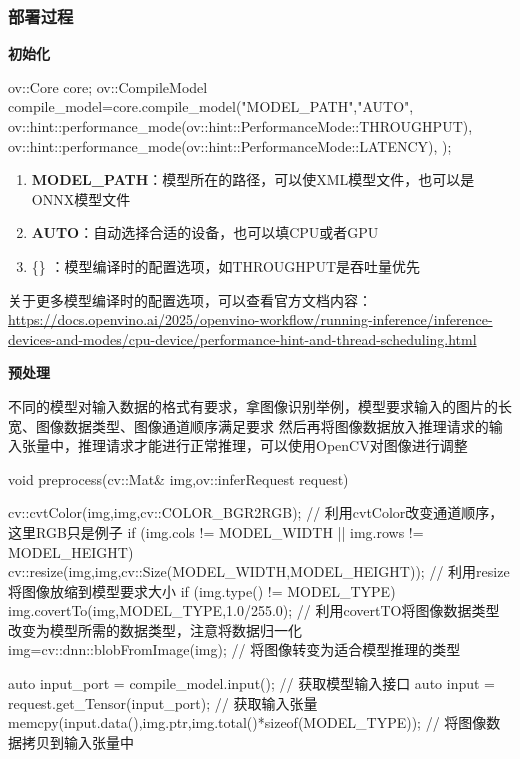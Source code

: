 \subsubsection{部署过程}

\textbf{初始化}

\begin{tcode}
    ov::Core core;
    ov::CompileModel compile_model=core.compile_model("MODEL_PATH","AUTO",{
        ov::hint::performance_mode(ov::hint::PerformanceMode::THROUGHPUT),
        ov::hint::performance_mode(ov::hint::PerformanceMode::LATENCY),
    });
\end{tcode}

\begin{enumerate}
    \item \textbf{MODEL\_PATH}：模型所在的路径，可以使XML模型文件，也可以是ONNX模型文件
    \item \textbf{AUTO}：自动选择合适的设备，也可以填CPU或者GPU
    \item \{\} ：模型编译时的配置选项，如THROUGHPUT是吞吐量优先
\end{enumerate}

关于更多模型编译时的配置选项，可以查看官方文档内容：\url{https://docs.openvino.ai/2025/openvino-workflow/running-inference/inference-devices-and-modes/cpu-device/performance-hint-and-thread-scheduling.html}

\textbf{预处理}

不同的模型对输入数据的格式有要求，拿图像识别举例，模型要求输入的图片的长宽、图像数据类型、图像通道顺序满足要求
然后再将图像数据放入推理请求的输入张量中，推理请求才能进行正常推理，可以使用OpenCV对图像进行调整

\begin{tcode}
    void preprocess(cv::Mat& img,ov::inferRequest request)
    {
        cv::cvtColor(img,img,cv::COLOR_BGR2RGB); // 利用cvtColor改变通道顺序，这里RGB只是例子
        if (img.cols != MODEL_WIDTH || img.rows != MODEL_HEIGHT)
        {
            cv::resize(img,img,cv::Size(MODEL_WIDTH,MODEL_HEIGHT)); // 利用resize将图像放缩到模型要求大小
        }
        if (img.type() != MODEL_TYPE)
        {
            img.covertTo(img,MODEL_TYPE,1.0/255.0); // 利用covertTO将图像数据类型改变为模型所需的数据类型，注意将数据归一化
        }
        img=cv::dnn::blobFromImage(img); // 将图像转变为适合模型推理的类型

        auto input_port = compile_model.input(); // 获取模型输入接口
        auto input = request.get_Tensor(input_port); // 获取输入张量
        memcpy(input.data(),img.ptr,img.total()*sizeof(MODEL_TYPE)); // 将图像数据拷贝到输入张量中
    }
\end{tcode}

